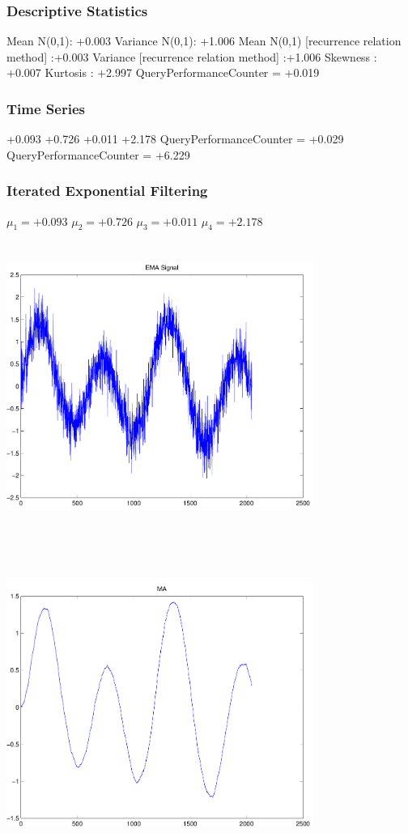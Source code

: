 \documentclass[9pt]{article}
\theoremstyle{plain}
\theoremstyle{definition}
\theoremstyle{remark}
\numberwithin{equation}{section}
\begin{document}
\subsubsection{Descriptive Statistics}
Mean N(0,1): +0.003
Variance N(0,1): +1.006
Mean N(0,1) [recurrence relation method] :+0.003
Variance [recurrence relation method] :+1.006
Skewness : +0.007
Kurtosis : +2.997
QueryPerformanceCounter  =  +0.019
\subsubsection{Time Series }
+0.093
+0.726
+0.011
+2.178
QueryPerformanceCounter  =  +0.029
QueryPerformanceCounter  =  +6.229
\subsubsection{Iterated Exponential Filtering }
$\mu_1 =+0.093$
$\mu_2 =+0.726$
$\mu_3 =+0.011$
$\mu_4 =+2.178$
\includegraphics[width=10.0cm,height=10.0cm]{EMA_signal.pdf}

\includegraphics[width=10.0cm,height=10.0cm]{MA.pdf}
\end{document}
